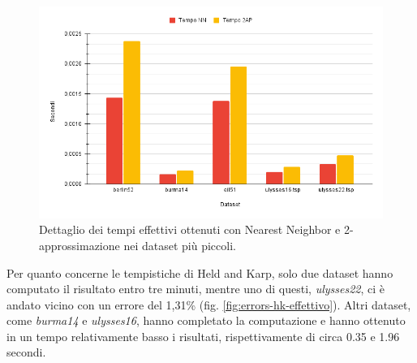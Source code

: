 \begin{figure}[H]
	\centering
	\includegraphics[width=1\textwidth]{res/images/time/time-detail-nn-2ap.png}
	\caption{Dettaglio dei tempi effettivi ottenuti con Nearest Neighbor e 2-approssimazione nei dataset più piccoli.}
	\label{fig:time-detail-nn-2ap}
\end{figure}

Per quanto concerne le tempistiche di Held and Karp, solo due dataset hanno computato il risultato entro tre minuti, mentre uno di questi, \textit{ulysses22}, ci è andato vicino con un errore del 1,31\% (fig. \ref{fig:errors-hk-effettivo}). Altri dataset, come \textit{burma14} e \textit{ulysses16}, hanno completato la computazione e hanno ottenuto in un tempo relativamente basso i risultati, rispettivamente di circa 0.35 e 1.96 secondi.